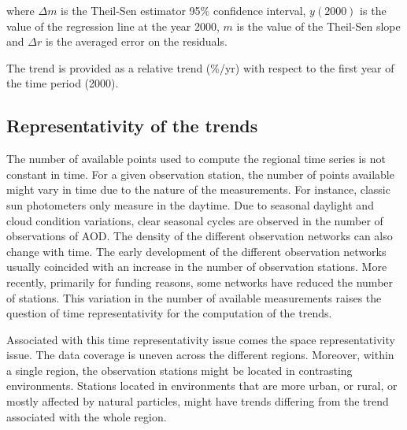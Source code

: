 \documentclass[journal abbreviation, manuscript]{copernicus}
\begin{document}
where $\Delta m$ is the Theil-Sen estimator 95\% confidence interval, $y(2000)$ is the value of the regression line at the year 2000, $m$ is the value of the Theil-Sen slope and $\Delta r$ is the averaged error on the residuals.

The trend is provided as a relative trend (\%/yr) with respect to the first year of the time period (2000).

\subsection{Representativity of the trends}
The number of available points used to compute the regional time series is not constant in time. For a given observation station, the number of points available might vary in time due to the nature of the measurements. For instance, classic sun photometers only measure in the daytime. Due to seasonal daylight and cloud condition variations, clear seasonal cycles are observed in the number of observations of AOD. The density of the different observation networks can also change with time. The early development of the different observation networks usually coincided with an increase in the number of observation stations. More recently, primarily for funding reasons, some networks have reduced the number of stations. This variation in the number of available measurements raises the question of time representativity for the computation of the trends.

Associated with this time representativity issue comes the space representativity issue. The data coverage is uneven across the different regions. Moreover, within a single region, the observation stations might be located in contrasting environments. Stations located in environments that are more urban, or rural, or mostly affected by natural particles, might have trends differing from the trend associated with the whole region.
\end{document}
